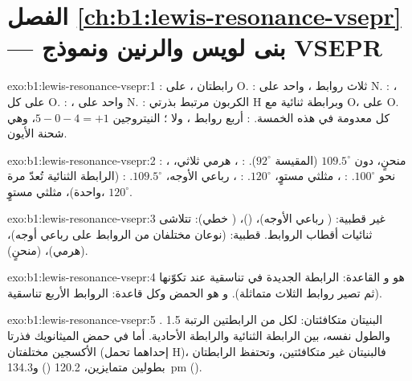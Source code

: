 \section*{الفصل \ref{ch:b1:lewis-resonance-vsepr} --- بنى لويس والرنين ونموذج VSEPR}

\begin{solution}{exo:b1:lewis-resonance-vsepr:1}
: رابطتان ،  على O. : ثلاث
روابط ،  واحد على N. : ، 
على كل O. : ،  واحد على N. : الكربون
مرتبط بذرتي H وبرابطة ثنائية مع O،  على O. كل  معدومة في هذه الخمسة. : أربع روابط ، ولا ؛ النيتروجين $5 - 0 - 4 = +1$، وهي شحنة الأيون.
\end{solution}

\begin{solution}{exo:b1:lewis-resonance-vsepr:2}
: ، منحنٍ، دون $109.5^\circ$ (المقيسة $92^\circ$).
: ، هرمي ثلاثي، نحو $100^\circ$.
: ، مثلثي مستوٍ، $120^\circ$. : ،
رباعي الأوجه، $109.5^\circ$. :  (الرابطة الثنائية
تُعدّ مرة واحدة)، مثلثي مستوٍ، $120^\circ$.
\end{solution}

\begin{solution}{exo:b1:lewis-resonance-vsepr:3}
غير قطبية:  ( رباعي الأوجه)،  ()،
 ( خطي): تتلاشى ثنائيات أقطاب الروابط. قطبية: 
(نوعان مختلفان من الروابط على رباعي أوجه)،  (هرمي)،
 (منحنٍ).
\end{solution}

\begin{solution}{exo:b1:lewis-resonance-vsepr:4}
 هو  و القاعدة: الرابطة  الجديدة في
 تناسقية عند تكوّنها (ثم تصير روابط  الثلاث
متماثلة). و هو الحمض وكل  قاعدة: الروابط 
الأربع تناسقية.
\end{solution}

\begin{solution}{exo:b1:lewis-resonance-vsepr:5}
.
البنيتان متكافئتان: لكل من الرابطتين  الرتبة 1.5
والطول نفسه، بين الرابطة الثنائية والرابطة الأحادية. أما في حمض الميثانويك
فذرتا الأكسجين مختلفتان (إحداهما تحمل H)، فالبنيتان غير
متكافئتين، وتحتفظ الرابطتان بطولين متمايزين، 120.2 ()
و\qty{134.3}{pm} ().
\end{solution}

